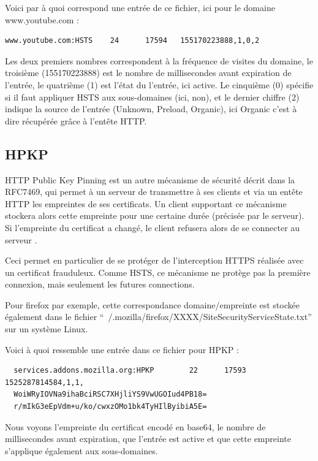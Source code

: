 Voici par à quoi correspond une entrée de ce fichier, ici pour le domaine www.youtube.com :

\begin{verbatim}
www.youtube.com:HSTS    24      17594   155170223888,1,0,2
\end{verbatim}

Les deux premiers nombres correspondent à la fréquence de visites du domaine, le troisième (155170223888) est le nombre de millisecondes avant expiration de l'entrée, le quatrième (1) est l'état du l'entrée, ici active. Le cinquième (0) spécifie si il faut appliquer HSTS aux sous-domaines (ici, non), et le dernier chiffre (2) indique la source de l'entrée (Unknown, Preload, Organic), ici Organic c'est à dire récupérée grâce à l'entête HTTP.

\subsection{HPKP}

HTTP Public Key Pinning est un autre mécanisme de sécurité décrit dans la RFC7469, qui permet à un serveur de transmettre à ses clients et via un entête HTTP les empreintes de ses certificats. Un client supportant ce mécanisme stockera alors cette empreinte pour une certaine durée (précisée par le serveur). Si l'empreinte du certificat a changé, le client refusera alors de se connecter au serveur \cite{hpkp}.

Ceci permet en particulier de se protéger de l'interception HTTPS réalisée avec un certificat frauduleux. Comme HSTS, ce mécanisme ne protège pas la première connexion, mais seulement les futures connections.

Pour firefox par exemple, cette correspondance domaine/empreinte est stockée également dans le fichier ``~/.mozilla/firefox/XXXX/SiteSecurityServiceState.txt'' sur un système Linux.

Voici à quoi ressemble une entrée dans ce fichier pour HPKP :

\begin{verbatim}
  services.addons.mozilla.org:HPKP        22      17593   1525287814584,1,1,
  WoiWRyIOVNa9ihaBciRSC7XHjliYS9VwUGOIud4PB18=
  r/mIkG3eEpVdm+u/ko/cwxzOMo1bk4TyHIlByibiA5E=
\end{verbatim}

Nous voyons l'empreinte du certificat encodé en base64, le nombre de millisecondes avant expiration, que l'entrée est active et que cette empreinte s'applique également aux sous-domaines.


